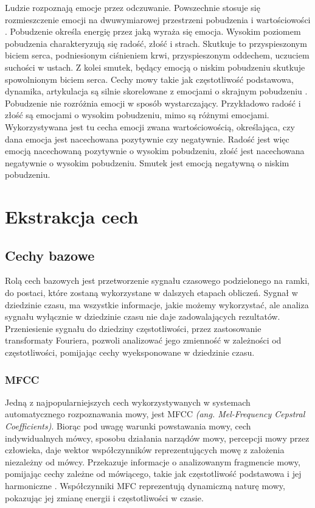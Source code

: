 \documentclass[a4paper,12pt,twoside,openany]{report}
\newcommand{\ang}[1]{\textit{(ang. #1)}}
\begin{document}
Ludzie rozpoznają emocje przez odczuwanie. 
Powszechnie stosuje się rozmieszczenie emocji na dwuwymiarowej przestrzeni pobudzenia i wartościowości \cite{Fernandez2004}.
Pobudzenie określa energię przez jaką wyraża się emocja.
Wysokim poziomem pobudzenia charakteryzują się radość, złość i strach. 
Skutkuje to przyspieszonym biciem serca, podniesionym ciśnieniem krwi, przyspieszonym oddechem, uczuciem suchości w ustach.
Z kolei smutek, będący emocją o niskim pobudzeniu skutkuje spowolnionym biciem serca.
Cechy mowy takie jak częstotliwość podstawowa, dynamika, artykulacja są silnie skorelowane z emocjami o skrajnym pobudzeniu \cite{Cahn1990}.
Pobudzenie nie rozróżnia emocji w sposób wystarczający. 
Przykładowo radość i złość są emocjami o wysokim pobudzeniu, mimo są różnymi emocjami.
Wykorzystywana jest tu cecha emocji zwana wartościowością, określająca, czy dana emocja jest nacechowana pozytywnie czy negatywnie.
Radość jest więc emocją nacechowaną pozytywnie o wysokim pobudzeniu, złość jest nacechowana negatywnie o wysokim pobudzeniu.
Smutek jest emocją negatywną o niskim pobudzeniu.


\section{Ekstrakcja cech}
\subsection{Cechy bazowe}
Rolą cech bazowych jest przetworzenie sygnału czasowego podzielonego na ramki,
do postaci, które zostaną wykorzystane w dalszych etapach obliczeń.
Sygnał w dziedzinie czasu, ma wszystkie informacje, jakie możemy wykorzystać, 
ale analiza sygnału wyłącznie w dziedzinie czasu nie daje zadowalających rezultatów.
Przeniesienie sygnału do dziedziny częstotliwości, przez zastosowanie transformaty Fouriera,
pozwoli analizować jego zmienność w zależności od częstotliwości, 
pomijając cechy wyeksponowane w dziedzinie czasu.
\subsubsection{MFCC}
Jedną z najpopularniejszych cech wykorzystywanych w systemach automatycznego rozpoznawania mowy,
jest MFCC \ang{Mel-Frequency Cepstral Coefficients}.
Biorąc pod uwagę warunki powstawania mowy, cech indywidualnych mówcy, sposobu działania narządów mowy, percepcji mowy przez człowieka,
daje wektor współczynników reprezentujących mowę z założenia niezależny od mówcy. 
Przekazuje informacje o analizowanym fragmencie mowy, pomijając cechy zależne od mówiącego, takie jak częstotliwość podstawowa i jej harmoniczne \cite{Hossan2013}.
Współczynniki MFC reprezentują dynamiczną naturę mowy, pokazując jej zmianę energii i częstotliwości w czasie.
\end{document}
